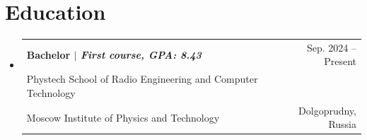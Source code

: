 \documentclass[A4,11pt]{article}
\makeatletter
\newcommand{\CVSubheading}[4]{
  \vspace{-2pt}\item
    \begin{tabular*}{0.97\textwidth}[t]{l@{\extracolsep{\fill}}r}
      \textbf{#1} & #2 \\
      \small#3 & \small #4 \\
    \end{tabular*}\vspace{-7pt}
}
\newcommand{\CVSubHeadingListStart}{\begin{itemize}[leftmargin=0.5cm, label={}]}
\newcommand{\CVSubHeadingListEnd}{\end{itemize}}
\makeatother
\begin{document}

\section{Education}
  \CVSubHeadingListStart
    \CVSubheading
      {{Bachelor $|$ \emph{\small{First course, GPA: 8.43}}}}{Sep. 2024 -- Present}
      {Phystech School of Radio Engineering and Computer Technology \\ Moscow Institute of Physics and Technology}{Dolgoprudny, Russia}
  \CVSubHeadingListEnd
\end{document}
